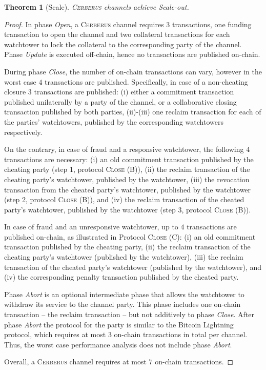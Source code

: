 \documentclass[twocolumn,showpacs,%
  nofootinbib,aps,superscriptaddress,%
  eqsecnum,prd,notitlepage,showkeys,10pt]{revtex4-1}
\newtheorem{theorem}{Theorem}
\newcommand{\sys}{\textsc{Cerberus}\xspace}
\begin{document}
\begin{theorem}[Scale]
\sys channels achieve Scale-out.
\end{theorem}
\begin{proof}
In phase \textit{Open}, a \sys channel requires $3$ transactions, one funding transaction to open the channel and two collateral transactions for each watchtower to lock the collateral to the corresponding party of the channel.
Phase \textit{Update} is executed off-chain, hence no transactions are published on-chain.

During phase \textit{Close}, the number of on-chain transactions can vary, however in the worst case $4$ transactions are published.
Specifically, in case of a non-cheating closure $3$ transactions are published: (i) either a commitment transaction published unilaterally by a party of the channel, or a collaborative closing transaction published by both parties, (ii)-(iii) one reclaim transaction for each of the parties' watchtowers, published by the corresponding watchtowers respectively.

On the contrary, in case of fraud and a responsive watchtower, the following $4$ transactions are necessary: (i) an old commitment transaction published by the cheating party (step 1, protocol \textsc{Close (B)}), (ii) the reclaim transaction of the cheating party's watchtower, published by the watchtower, (iii) the revocation transaction from the cheated party's watchtower, published by the watchtower (step 2, protocol \textsc{Close (B)}), and (iv) the reclaim transaction of the cheated party's watchtower, published by the watchtower (step 3, protocol \textsc{Close (B)}).

In case of fraud and an unresponsive watchtower, up to $4$ transactions are published on-chain, as illustrated in Protocol \textsc{Close (C)}: (i) an old commitment transaction published by the cheating party, (ii) the reclaim transaction of the cheating party's watchtower (published by the watchtower), (iii) the reclaim transaction of the cheated party's watchtower (published by the watchtower), and (iv) the corresponding penalty transaction published by the cheated party.

Phase \textit{Abort} is an optional intermediate phase that allows the watchtower to withdraw its service to the channel party. This phase includes one on-chain transaction -- the reclaim transaction -- but not additively to phase \textit{Close}. After phase \textit{Abort} the protocol for the party is similar to the Bitcoin Lightning protocol, which  requires at most $3$ on-chain transactions in total per channel. Thus, the worst case performance analysis does not include phase \textit{Abort}.

Overall, a \sys channel requires at most $7$ on-chain transactions.
\end{proof}
\end{document}
